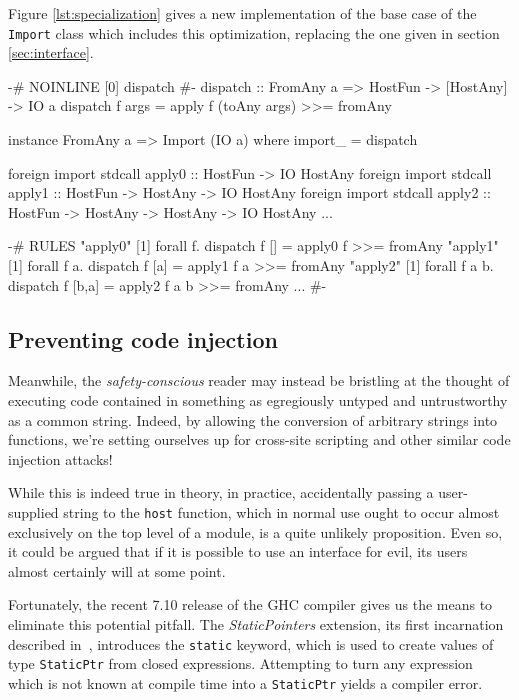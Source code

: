 \documentclass[preprint]{sigplanconf}
\begin{document}
Figure \ref{lst:specialization} gives a new implementation of the base case
of the \lstinline!Import! class which includes this optimization, replacing
the one given in section \ref{sec:interface}.

\begin{listingfloat}
\begin{code}
{-# NOINLINE [0] dispatch #-}
dispatch :: FromAny a => HostFun -> [HostAny] -> IO a
dispatch f args = apply f (toAny args) >>= fromAny

instance FromAny a => Import (IO a) where
  import_ = dispatch

foreign import stdcall apply0 ::
  HostFun -> IO HostAny
foreign import stdcall apply1 ::
  HostFun -> HostAny -> IO HostAny
foreign import stdcall apply2 ::
  HostFun -> HostAny -> HostAny -> IO HostAny
...

{-# RULES
"apply0" [1] forall f. dispatch f [] =
               apply0 f >>= fromAny
"apply1" [1] forall f a. dispatch f [a] =
               apply1 f a >>= fromAny
"apply2" [1] forall f a b. dispatch f [b,a] =
               apply2 f a b >>= fromAny
...
 #-}
\end{code}
\caption{Specializing the \lstinline!host! base case}
\label{lst:specialization}
\end{listingfloat}

\subsection{Preventing code injection}
\label{sec:safe_host}
Meanwhile, the \emph{safety-conscious} reader may instead be bristling at the
thought of executing code contained in something as egregiously untyped and
untrustworthy as a common string.
Indeed, by allowing the conversion of arbitrary strings
into functions, we're setting ourselves up for cross-site scripting and other
similar code injection attacks!

While this is indeed true in theory, in practice, accidentally passing a
user-supplied string to the \lstinline!host! function, which in normal use
ought to occur almost exclusively on the top level of a module, is a quite
unlikely proposition. Even so, it could be argued that if it is possible to use
an interface for evil, its users almost certainly will at some point.

Fortunately, the recent 7.10 release of the GHC compiler gives us the means to
eliminate this potential pitfall. The \emph{StaticPointers} extension, its
first incarnation described in\ \cite{cloudhaskell}, introduces the
\lstinline!static! keyword, which is used to create values of type
\lstinline!StaticPtr! from closed expressions. Attempting to turn any
expression which is not known at compile time into a \lstinline!StaticPtr!
yields a compiler error.
\end{document}
